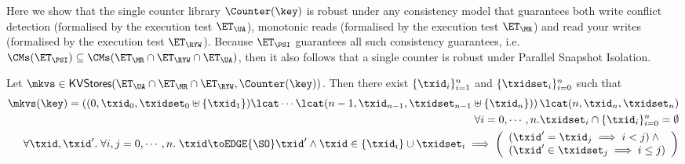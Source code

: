 Here we show that the  single counter library $\Counter(\key)$ is robust under any consistency model 
that guarantees both write conflict detection (formalised by the execution test 
$\ET_{\UA}$), monotonic reads (formalised by the execution test $\ET_{\MR}$) 
and read your writes (formalised by the execution test $\ET_{\RYW}$). 
Because $\ET_{\PSI}$ guarantees all such consistency guarantees, i.e. 
$\CMs(\ET_{\PSI}) \subseteq \CMs(\ET_{\MR} \cap \ET_{\RYW} \cap \ET_{\UA})$, 
then it also follows that a single counter is robust under Parallel Snapshot Isolation.
\begin{proposition}
\label{prop:counter_hhshape}
Let $\mkvs \in \mathsf{KVStores}(\ET_{\UA} \cap \ET_{\MR} \cap \ET_{\RYW}, \Counter(\key))$. 
Then there exist $\{\txid_i\}_{i = 1}^{n}$ and $\{\txidset_{i}\}_{i = 0}^{n}$ such that 
\begin{align}
\mkvs(\key) = \left( (0, \txid_{0}, \txidset_{0} \uplus \{\txid_1\}) \lcat \cdots \lcat (n-1, \txid_{n-1}, \txidset_{n-1} \uplus \{\txid_{n}\}) \right) 
\lcat (n, \txid_{n}, \txidset_{n}) \label{eq:psi_counter_shape}\\
\forall i=0,\cdots,n.\txidset_{i} \cap \{\txid_{i}\}_{i=0}^{n} = \emptyset \label{eq:psi_counter_rwtxs}\\
\forall \txid, \txid'.\;\forall i,j=0,\cdots, n.\; \txid \toEDGE{\SO} \txid' 
\land \txid \in \{\txid_{i}\} \cup \txidset_{i} \implies 
\left(\begin{array}{l}
(\txid' = \txid_{j} \implies i < j) \land {} \\
(\txid' \in \txidset_{j} \implies i \leq j) \\
\end{array}\right) \label{eq:psi_counter_so}
\end{align}
%
%
%
\end{proposition}

